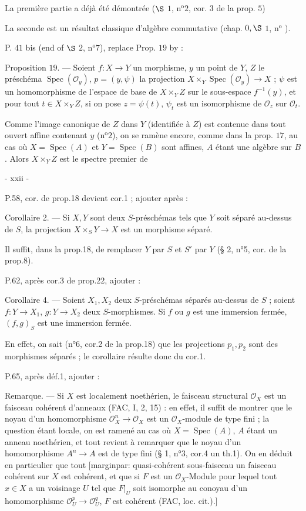 La première partie a déjà été démontrée ($\S$ $1$, n$^{\text{o}} 2$, cor. $3$ de la prop. $5$)

La seconde est un résultat classique d'algèbre commutative (chap. $0, \S$ $1$, n$^{\text{o}}$ ).

P. $41$ bis (end of $\S$ $2$, n$^{\text{o}} 7$), replace Prop. $19$ by :

Proposition $19$. — Soient $f : X \to Y$ un morphisme, $y$ un point de $Y$, $Z$ le préschéma $\operatorname{Spec}(\mathcal{O}_y)$, $p = (y, \psi)$ la projection $X \times_Y \operatorname{Spec}(\mathcal{O}_y) \to X$ ; $\psi$ est un homomorphisme de l'espace de base de $X \times_Y Z$ sur le sous-espace $f^{-1}(y)$, et pour tout $t \in X \times_Y Z$, si on pose $z = \psi(t)$, $\psi_t$ est un isomorphisme de $\mathcal{O}_z$ sur $\mathcal{O}_t$.

Comme l'image canonique de $Z$ dans $Y$ (identifiée à $Z$) est contenue dans tout ouvert affine contenant $y$ (n$^{\text{o}} 2$), on se ramène encore, comme dans la prop. $17$, au cas où $X = \operatorname{Spec}(A)$ et $Y = \operatorname{Spec}(B)$ sont affines, $A$ étant une algèbre sur $B$. Alors $X \times_Y Z$ est le spectre premier de

\newpage


- xxii -

P.58, cor. de prop.18 devient cor.1 ; ajouter après :

Corollaire 2. — Si $X, Y$ sont deux $S$-préschémas tels que $Y$ soit séparé au-dessus de $S$, la projection $X \times_S Y \to X$ est un morphisme séparé.

Il suffit, dans la prop.18, de remplacer $Y$ par $S$ et $S'$ par $Y$ (§ 2, n°5, cor. de la prop.8).

P.62, après cor.3 de prop.22, ajouter :

Corollaire 4. — Soient $X_1, X_2$ deux $S$-préschémas séparés au-dessus de $S$ ; soient $f: Y \to X_1$, $g: Y \to X_2$ deux $S$-morphismes. Si $f$ ou $g$ est une immersion fermée, $(f,g)_S$ est une immersion fermée.

En effet, on sait (n°6, cor.2 de la prop.18) que les projections $p_1, p_2$ sont des morphismes séparés ; le corollaire résulte donc du cor.1.

P.65, après déf.1, ajouter :

Remarque. — Si $X$ est localement noethérien, le faisceau structural $\mathcal{O}_X$ est un faisceau cohérent d'anneaux (FAC, I, 2, 15) : en effet, il suffit de montrer que le noyau d'un homomorphisme $\mathcal{O}_X^n \to \mathcal{O}_X$ est un $\mathcal{O}_X$-module de type fini ; la question étant locale, on est ramené au cas où $X = \operatorname{Spec}(A)$, $A$ étant un anneau noethérien, et tout revient à remarquer que le noyau d'un homomorphisme $A^n \to A$ est de type fini (§ 1, n°3, cor.4 un th.1). On en déduit en particulier que tout [marginpar: quasi-cohérent sous-faisceau un faisceau cohérent sur $X$ est cohérent, et que si $F$ est un $\mathcal{O}_X$-Module pour lequel tout $x \in X$ a un voisinage $U$ tel que $F|_U$ soit isomorphe au conoyau d'un homomorphisme $\mathcal{O}_U^p \to \mathcal{O}_U^q$, $F$ est cohérent (FAC, loc. cit.).]

